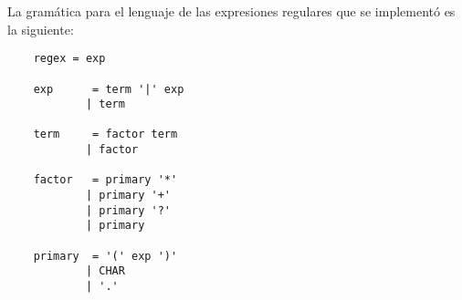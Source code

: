 La gramática para el lenguaje de las expresiones regulares que se implementó es la siguiente:

\begin{verbatim}
    regex = exp 

    exp      = term '|' exp    
            | term

    term     = factor term       
            | factor

    factor   = primary '*'      
            | primary '+'       
            | primary '?'       
            | primary

    primary  = '(' exp ')'
            | CHAR              
            | '.'
\end{verbatim}






